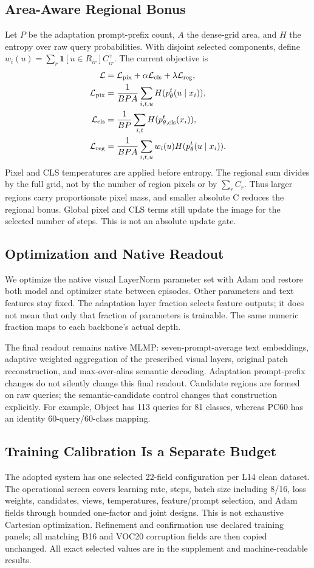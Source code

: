 \documentclass[10pt,twocolumn]{article}
\begin{document}
\subsection{Area-Aware Regional Bonus}
Let $P$ be the adaptation prompt-prefix count, $A$ the dense-grid area,
and $H$ the entropy over raw query probabilities. With disjoint selected
components, define $w_i(u)=\sum_r\mathbf{1}[u\in R_{ir}]C_{ir}^{\gamma}$.
The current objective is
\begin{align}
 \mathcal L &=\mathcal L_{\rm pix}+
     \alpha\mathcal L_{\rm cls}+\lambda\mathcal L_{\rm reg},\label{eq:objective}\\
 \mathcal L_{\rm pix}&=\frac{1}{BPA}\sum_{i,t,u}H(p^t_\theta(u\mid x_i)),\\
 \mathcal L_{\rm cls}&=\frac{1}{BP}\sum_{i,t}H(p^t_{\theta,\rm cls}(x_i)),\\
 \mathcal L_{\rm reg}&=\frac{1}{BPA}\sum_{i,t,u}w_i(u)H(p^t_\theta(u\mid x_i)).
\end{align}
Pixel and CLS temperatures are applied before entropy. The regional sum
divides by the full grid, not by the number of region pixels or by $\sum_r C_r$.
Thus larger regions carry proportionate pixel mass, and smaller absolute C
reduces the regional bonus. Global pixel and CLS terms still update the
image for the selected number of steps. This is not an absolute update gate.

\subsection{Optimization and Native Readout}
We optimize the native visual LayerNorm parameter set with Adam and restore
both model and optimizer state between episodes. Other parameters and text
features stay fixed. The adaptation layer fraction selects feature outputs;
it does not mean that only that fraction of parameters is trainable. The same
numeric fraction maps to each backbone's actual depth.

The final readout remains native MLMP: seven-prompt-average text embeddings,
adaptive weighted aggregation of the prescribed visual layers, original
patch reconstruction, and max-over-alias semantic decoding. Adaptation
prompt-prefix changes do not silently change this final readout. Candidate
regions are formed on raw queries; the semantic-candidate control changes
that construction explicitly. For example, Object has 113 queries for 81
classes, whereas PC60 has an identity 60-query/60-class mapping.

\subsection{Training Calibration Is a Separate Budget}
The adopted system has one selected 22-field configuration per L14 clean
dataset. The operational screen covers learning rate, steps, batch size
including 8/16, loss weights, candidates, views, temperatures, feature/prompt
selection, and Adam fields through bounded one-factor and joint designs.
This is not exhaustive Cartesian optimization. Refinement and confirmation
use declared training panels; all matching B16 and VOC20 corruption fields
are then copied unchanged. All exact selected values are in the supplement
and machine-readable results.
\end{document}
